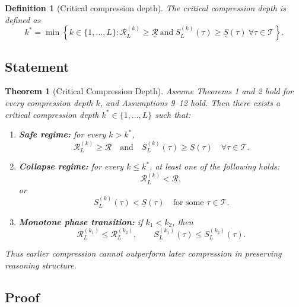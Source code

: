 \documentclass[11pt]{article}
\newtheorem{theorem}{Theorem}
\newtheorem{definition}{Definition}
\newcommand{\T}{\mathcal{T}}
\begin{document}
\begin{definition}[Critical compression depth]
The critical compression depth is defined as
\[
k^*
=
\min
\left\{
k \in \{1,\dots,L\} :
\mathcal{R}^{(k)}_L \ge \underline{\mathcal{R}}
\ \text{and}\
S^{(k)}_L(\tau)\ge \underline{S}(\tau)
\ \forall \tau \in \T
\right\}.
\]
\end{definition}

\subsection{Statement}

\begin{theorem}[Critical Compression Depth]
Assume Theorems 1 and 2 hold for every compression depth $k$, and Assumptions 9--12 hold. Then there exists a critical compression depth $k^*\in\{1,\dots,L\}$ such that:

\begin{enumerate}[label=(\roman*)]
    \item \textbf{Safe regime:} for every $k > k^*$,
    \[
    \mathcal{R}^{(k)}_L \ge \underline{\mathcal{R}}
    \quad \text{and} \quad
    S^{(k)}_L(\tau)\ge \underline{S}(\tau)
    \quad \forall \tau \in \T.
    \]
    \item \textbf{Collapse regime:} for every $k \le k^*$, at least one of the following holds:
    \[
    \mathcal{R}^{(k)}_L < \underline{\mathcal{R}},
    \]
    or
    \[
    S^{(k)}_L(\tau) < \underline{S}(\tau)
    \quad \text{for some } \tau \in \T.
    \]
    \item \textbf{Monotone phase transition:} if $k_1<k_2$, then
    \[
    \mathcal{R}^{(k_1)}_L \le \mathcal{R}^{(k_2)}_L,
    \qquad
    S^{(k_1)}_L(\tau) \le S^{(k_2)}_L(\tau).
    \]
\end{enumerate}
Thus earlier compression cannot outperform later compression in preserving reasoning structure.
\end{theorem}

\subsection{Proof}
\end{document}
